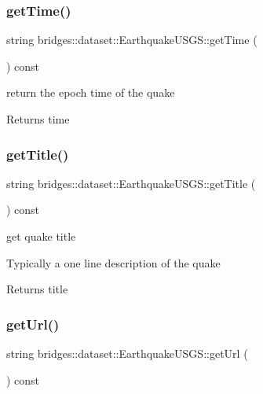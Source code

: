 \subsubsection{\texorpdfstring{getTime()}{getTime()}}
{\footnotesize\ttfamily string bridges\+::dataset\+::\+Earthquake\+U\+S\+G\+S\+::get\+Time (\begin{DoxyParamCaption}{ }\end{DoxyParamCaption}) const\hspace{0.3cm}{\ttfamily [inline]}}



return the epoch time of the quake 

\begin{DoxyReturn}{Returns}
time 
\end{DoxyReturn}
\mbox{\label{classbridges_1_1dataset_1_1_earthquake_u_s_g_s_a3e63533e53a119ceeb98c97ff35abc4a}} 
\subsubsection{\texorpdfstring{getTitle()}{getTitle()}}
{\footnotesize\ttfamily string bridges\+::dataset\+::\+Earthquake\+U\+S\+G\+S\+::get\+Title (\begin{DoxyParamCaption}{ }\end{DoxyParamCaption}) const\hspace{0.3cm}{\ttfamily [inline]}}



get quake title 

Typically a one line description of the quake

\begin{DoxyReturn}{Returns}
title 
\end{DoxyReturn}
\mbox{\label{classbridges_1_1dataset_1_1_earthquake_u_s_g_s_ab009982ed697df7ea2c913eb2b7e88be}} 
\subsubsection{\texorpdfstring{getUrl()}{getUrl()}}
{\footnotesize\ttfamily string bridges\+::dataset\+::\+Earthquake\+U\+S\+G\+S\+::get\+Url (\begin{DoxyParamCaption}{ }\end{DoxyParamCaption}) const\hspace{0.3cm}{\ttfamily [inline]}}



